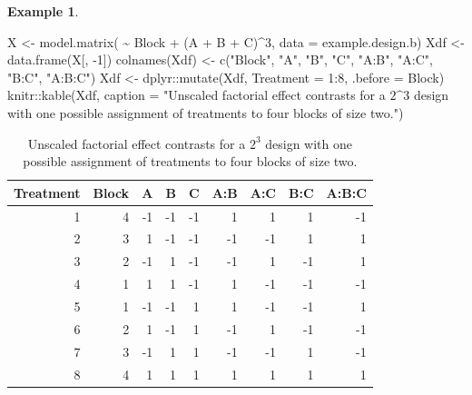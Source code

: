 \documentclass[
]{book}
\newenvironment{Shaded}{\begin{snugshade}}{\end{snugshade}}
\newcommand{\AttributeTok}[1]{\textcolor[rgb]{0.77,0.63,0.00}{#1}}
\newcommand{\DecValTok}[1]{\textcolor[rgb]{0.00,0.00,0.81}{#1}}
\newcommand{\FunctionTok}[1]{\textcolor[rgb]{0.00,0.00,0.00}{#1}}
\newcommand{\NormalTok}[1]{#1}
\newcommand{\OtherTok}[1]{\textcolor[rgb]{0.56,0.35,0.01}{#1}}
\newcommand{\SpecialCharTok}[1]{\textcolor[rgb]{0.00,0.00,0.00}{#1}}
\newcommand{\StringTok}[1]{\textcolor[rgb]{0.31,0.60,0.02}{#1}}
\theoremstyle{definition}
\theoremstyle{definition}
\newtheorem{example}{Example}[chapter]
\theoremstyle{definition}
\theoremstyle{definition}
\theoremstyle{remark}
\begin{document}
\begin{example}
\begin{Shaded}
\begin{Highlighting}[]
\NormalTok{X }\OtherTok{\textless{}{-}} \FunctionTok{model.matrix}\NormalTok{( }\SpecialCharTok{\textasciitilde{}}\NormalTok{ Block }\SpecialCharTok{+}\NormalTok{ (A }\SpecialCharTok{+}\NormalTok{ B }\SpecialCharTok{+}\NormalTok{ C)}\SpecialCharTok{\^{}}\DecValTok{3}\NormalTok{, }\AttributeTok{data =}\NormalTok{ example.design.b)}
\NormalTok{Xdf }\OtherTok{\textless{}{-}} \FunctionTok{data.frame}\NormalTok{(X[, }\SpecialCharTok{{-}}\DecValTok{1}\NormalTok{])}
\FunctionTok{colnames}\NormalTok{(Xdf) }\OtherTok{\textless{}{-}} \FunctionTok{c}\NormalTok{(}\StringTok{"Block"}\NormalTok{, }\StringTok{"A"}\NormalTok{, }\StringTok{"B"}\NormalTok{, }\StringTok{"C"}\NormalTok{, }\StringTok{"A:B"}\NormalTok{, }\StringTok{"A:C"}\NormalTok{, }\StringTok{"B:C"}\NormalTok{, }\StringTok{"A:B:C"}\NormalTok{)}
\NormalTok{Xdf }\OtherTok{\textless{}{-}}\NormalTok{ dplyr}\SpecialCharTok{::}\FunctionTok{mutate}\NormalTok{(Xdf, }\AttributeTok{Treatment =} \DecValTok{1}\SpecialCharTok{:}\DecValTok{8}\NormalTok{, }\AttributeTok{.before =}\NormalTok{ Block)}
\NormalTok{knitr}\SpecialCharTok{::}\FunctionTok{kable}\NormalTok{(Xdf, }\AttributeTok{caption =} \StringTok{"Unscaled factorial effect contrasts for a $2\^{}3$ design with one possible assignment of treatments to four blocks of size two."}\NormalTok{)}
\end{Highlighting}
\end{Shaded}

\begin{table}

\caption{\label{tab:block-frac-2-mm}Unscaled factorial effect contrasts for a $2^3$ design with one possible assignment of treatments to four blocks of size two.}
\centering
\begin{tabular}[t]{r|r|r|r|r|r|r|r|r}
\hline
Treatment & Block & A & B & C & A:B & A:C & B:C & A:B:C\\
\hline
1 & 4 & -1 & -1 & -1 & 1 & 1 & 1 & -1\\
\hline
2 & 3 & 1 & -1 & -1 & -1 & -1 & 1 & 1\\
\hline
3 & 2 & -1 & 1 & -1 & -1 & 1 & -1 & 1\\
\hline
4 & 1 & 1 & 1 & -1 & 1 & -1 & -1 & -1\\
\hline
5 & 1 & -1 & -1 & 1 & 1 & -1 & -1 & 1\\
\hline
6 & 2 & 1 & -1 & 1 & -1 & 1 & -1 & -1\\
\hline
7 & 3 & -1 & 1 & 1 & -1 & -1 & 1 & -1\\
\hline
8 & 4 & 1 & 1 & 1 & 1 & 1 & 1 & 1\\
\hline
\end{tabular}
\end{table}


\end{example}
\end{document}
